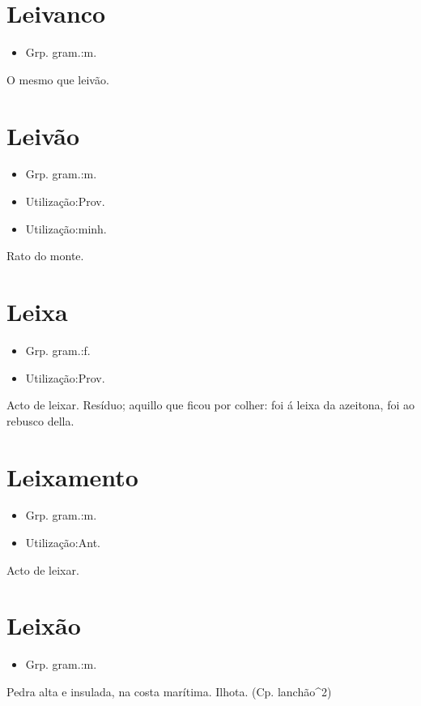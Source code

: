 \section{Leivanco}
\begin{itemize}
\item {Grp. gram.:m.}
\end{itemize}
O mesmo que \textunderscore leivão\textunderscore .
\section{Leivão}
\begin{itemize}
\item {Grp. gram.:m.}
\end{itemize}
\begin{itemize}
\item {Utilização:Prov.}
\end{itemize}
\begin{itemize}
\item {Utilização:minh.}
\end{itemize}
Rato do monte.
\section{Leixa}
\begin{itemize}
\item {Grp. gram.:f.}
\end{itemize}
\begin{itemize}
\item {Utilização:Prov.}
\end{itemize}
Acto de leixar.
Resíduo; aquillo que ficou por colher: \textunderscore foi á leixa da azeitona\textunderscore , foi ao rebusco della.
\section{Leixamento}
\begin{itemize}
\item {Grp. gram.:m.}
\end{itemize}
\begin{itemize}
\item {Utilização:Ant.}
\end{itemize}
Acto de leixar.
\section{Leixão}
\begin{itemize}
\item {Grp. gram.:m.}
\end{itemize}
Pedra alta e insulada, na costa marítima.
Ilhota.
(Cp. \textunderscore lanchão\textunderscore ^2)
